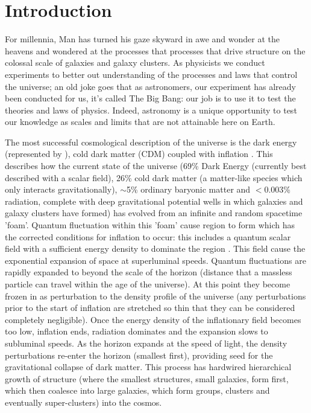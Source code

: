 \chapter{Introduction}
For millennia, Man has turned his gaze skyward in awe and wonder at the heavens and wondered at the processes that processes that drive structure on the colossal scale of galaxies and galaxy clusters. As physicists we conduct experiments to better out understanding of the processes and laws that control the universe; an old joke goes that as astronomers, our experiment has already been conducted for us, it's called The Big Bang: our job is to use it to test the theories and laws of physics. Indeed, astronomy is a unique opportunity to test our knowledge as scales and limits that are not attainable here on Earth.

The most successful cosmological description of the universe is the dark energy (represented by \textLambda), cold dark matter ({\textLambda}CDM) coupled with inflation \citep{Guth1981}. This describes how the current state of the universe (69\% Dark Energy (currently best described with a scalar field), 26\% cold dark matter (a matter-like species which only interacts gravitationally), $\sim$5\% ordinary baryonic matter and $<$0.003\% radiation, complete with deep gravitational potential wells in which galaxies and galaxy clusters have formed) has evolved from an infinite and random spacetime 'foam'. Quantum fluctuation within this 'foam' cause region to form which has the corrected conditions for inflation to occur: this includes a quantum scalar field with a sufficient energy density to dominate the region \citep{Linde1982, Albrecht1982}. This field cause the exponential expansion of space at superluminal speeds. Quantum fluctuations are rapidly expanded to beyond the scale of the horizon (distance that a massless particle can travel within the age of the universe). At this point they become frozen in as perturbation to the density profile of the universe (any perturbations prior to the start of inflation are stretched so thin that they can be considered completely negligible). Once the energy density of the inflationary field becomes too low, inflation ends, radiation dominates and the expansion slows to subluminal speeds. As the horizon expands at the speed of light, the density perturbations re-enter the horizon (smallest first), providing seed for the gravitational collapse of dark matter. This process has hardwired hierarchical growth of structure (where the smallest structures, small galaxies, form first, which then coalesce into large galaxies, which form groups, clusters and eventually super-clusters) into the cosmos. 

